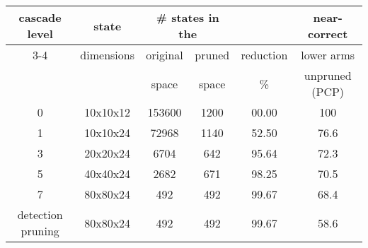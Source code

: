 \begin{tabular}{|c|c|c|c|c|c|}
\hline
\multirow{3}{*}{cascade level}   & state        & \multicolumn{2}{|c|}{\# 
states in the}        &  \multirow{3}{*}{ } state space       & near-correct \\\cline{3-4}
 &       dimensions &original   & pruned        & reduction     &  lower arms  \\
 &       & space        & space & \%    & unpruned (PCP) \\

\hline
\hline
0        & 10x10x12      & 153600        & 1200 &        00.00 & 100  \\
\hline
1        & 10x10x24      & 72968 &      1140  &  52.50   & 76.6 \\
\hline
3        & 20x20x24      & 6704  & 642  &  95.64         & 72.3 \\
\hline
5        & 40x40x24      & 2682  & 671   & 98.25         & 70.5 \\
\hline 
7        & 80x80x24      & 492   & 492&          99.67   & 68.4 \\
\hline
\hline
detection pruning        & 80x80x24      & 492   & 492&          99.67   & 58.6 \\
\hline
\end{tabular}

